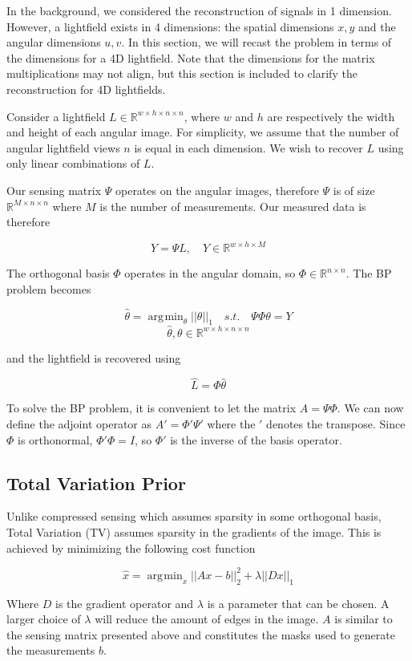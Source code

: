 \documentclass[10pt,twocolumn,letterpaper]{article}
\DeclareMathOperator*{\argmin}{\arg\!\min}
\begin{document}
In the background, we considered the reconstruction of signals in 1 dimension. However, a lightfield exists in 4 dimensions: the spatial dimensions $x, y$ and the angular dimensions $u, v$. In this section, we will recast the problem in terms of the dimensions for a 4D lightfield. Note that the dimensions for the matrix multiplications may not align, but this section is included to clarify the reconstruction for 4D lightfields.

Consider a lightfield $L \in \mathbb{R}^{w \times h \times n \times n}$, where $w$ and $h$ are respectively the width and height of each angular image. For simplicity, we assume that the number of angular lightfield views $n$ is equal in each dimension. We wish to recover $L$ using only linear combinations of $L$.

Our sensing matrix $\Psi$ operates on the angular images, therefore $\Psi$ is of size $\mathbb{R}^{M \times n \times n}$ where $M$ is the number of measurements. Our measured data is therefore

\[Y = \Psi L, \quad Y \in \mathbb{R}^{w \times h \times M}\]

The orthogonal basis $\Phi$ operates in the angular domain, so $\Phi \in \mathbb{R}^{n \times n}$. The BP problem becomes

\[ \hat{\theta} = \argmin_\theta ||\theta||_1 \quad s.t. \quad \Psi\Phi\theta = Y\]
\[ \hat{\theta}, \theta \in \mathbb{R}^{w \times h \times n \times n}\]

and the lightfield is recovered using

\[ \hat{L} = \Phi \hat{\theta}\]

To solve the BP problem, it is convenient to let the matrix $A = \Psi\Phi$. We can now define the adjoint operator as $A' = \Phi'\Psi'$ where the $'$ denotes the transpose. Since $\Phi$ is orthonormal, $\Phi'\Phi = I$, so $\Phi'$ is the inverse of the basis operator. 

\subsection{Total Variation Prior}

Unlike compressed sensing which assumes sparsity in some orthogonal basis, Total Variation (TV) assumes sparsity in the gradients of the image. This is achieved by minimizing the following cost function

\[ \hat{x} = \argmin_x ||Ax - b||^2_2 + \lambda ||D x||_1 \]

Where $D$ is the gradient operator and $\lambda$ is a parameter that can be chosen. A larger choice of $\lambda$ will reduce the amount of edges in the image. $A$ is similar to the sensing matrix presented above and constitutes the masks used to generate the measurements $b$.
\end{document}
